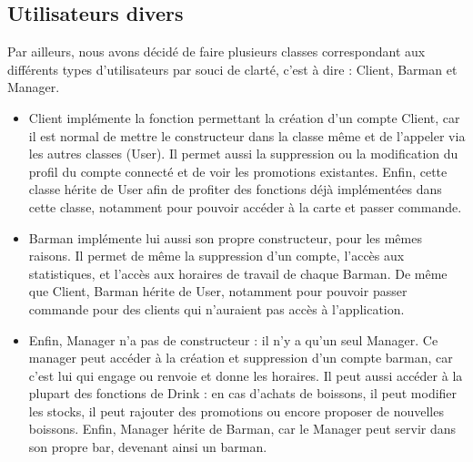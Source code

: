 \documentclass{article}
\begin{document}
\subsection{Utilisateurs divers}
Par ailleurs, nous avons décidé de faire plusieurs classes correspondant aux différents types d'utilisateurs par souci de clarté, c'est à dire : Client, Barman et Manager. \\


\begin{itemize}\renewcommand{\labelitemi}{$\bullet$}
\item Client implémente la fonction permettant la création d'un compte Client, car il est normal de mettre le constructeur dans la classe même et de l'appeler via les autres classes (User). Il permet aussi la suppression ou la modification du profil du compte connecté et de voir les promotions existantes. Enfin, cette classe hérite de User afin de profiter des fonctions déjà implémentées dans cette classe, notamment pour pouvoir accéder à la carte et passer commande.
\item Barman implémente lui aussi son propre constructeur, pour les mêmes raisons. Il permet de même la suppression d'un compte, l'accès aux statistiques, et l'accès aux horaires de travail de chaque Barman. De même que Client, Barman hérite de User, notamment pour pouvoir passer commande pour des clients qui n'auraient pas accès à l'application.
\item Enfin, Manager n'a pas de constructeur : il n'y a qu'un seul Manager. Ce manager peut accéder à la création et suppression d'un compte barman, car c'est lui qui engage ou renvoie et donne les horaires. Il peut aussi accéder à la plupart des fonctions de Drink : en cas d'achats de boissons, il peut modifier les stocks, il peut rajouter des promotions ou encore proposer de nouvelles boissons. Enfin, Manager hérite de Barman, car le Manager peut servir dans son propre bar, devenant ainsi un barman.


\end{itemize}
\end{document}
